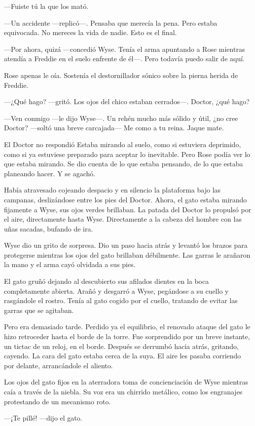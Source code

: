 {---Fuiste tú la que los mató.}

{---Un accidente ---replicó---. Pensaba que merecía la pena. Pero estaba
equivocada. No mereces la vida de nadie. Esto es el final.}

{---Por ahora, quizá ---concedió Wyse. Tenía el arma apuntando a Rose
	mientras atendía a Freddie en el suelo enfrente de él---. Pero todavía
puedo salir de aquí.}

{Rose apenas le oía. Sostenía el destornillador sónico sobre la pierna
herida de Freddie.}

{---¿Qué hago? ---gritó. Los ojos del chico estaban cerrados---. Doctor,
¿qué hago?}

{---Ven conmigo ---le dijo Wyse---. Un rehén mucho más sólido y útil,
	¿no cree Doctor? ---soltó una breve carcajada--- Me como a tu reina.
Jaque mate.}

{El Doctor no respondió Estaba mirando al suelo, como si estuviera
	deprimido, como si ya estuviese preparado para aceptar lo inevitable.
	Pero Rose podía ver lo que estaba mirando. Se dio cuenta de lo que
estaba pensando, de lo que estaba planeando hacer. Y se agachó.}

{Había atravesado cojeando despacio y en silencio la plataforma bajo las
	campanas, deslizándose entre los pies del Doctor. Ahora, el gato estaba
	mirando fijamente a Wyse, sus ojos verdes brillaban. La patada del
	Doctor lo propulsó por el aire, directamente hasta Wyse. Directamente a
la cabeza del hombre con las uñas sacadas, bufando de ira.}

{Wyse dio un grito de sorpresa. Dio un paso hacia atrás y levantó los
	brazos para protegerse mientras los ojos del gato brillaban débilmente.
Las garras le arañaron la mano y el arma cayó olvidada a sus pies.}

{El gato gruñó dejando al descubierto sus afilados dientes en la boca
	completamente abierta. Arañó y desgarró a Wyse, pegándose a su cuello y
	rasgándole el rostro. Tenía al gato cogido por el cuello, tratando de
evitar las garras que se agitaban.}

{Pero era demasiado tarde. Perdido ya el equilibrio, el renovado ataque
	del gato le hizo retroceder hasta el borde de la torre. Fue sorprendido
	por un breve instante, un tictac de un reloj, en el borde. Después se
	derrumbó hacia atrás, gritando, cayendo. La cara del gato estaba cerca
	de la suya. El aire les pasaba corriendo por delante, arrancándole el
aliento.}

{Los ojos del gato fijos en la aterradora toma de concienciación de Wyse
	mientras caía a través de la niebla. Su voz era un chirrido metálico,
como los engranajes protestando de un mecanismo roto.}

{---¡Te pillé! ---dijo el gato.}
